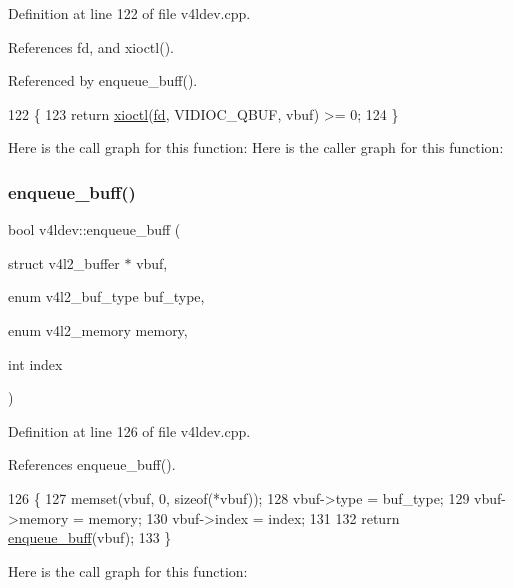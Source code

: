 Definition at line 122 of file v4ldev.\+cpp.



References fd, and xioctl().



Referenced by enqueue\+\_\+buff().


\begin{DoxyCode}
122                                                    \{
123     \textcolor{keywordflow}{return} \hyperlink{classv4ldev_ab93cb1ab18254ca362310b006bd2552d}{xioctl}(\hyperlink{classv4ldev_a2cd44be3be75a19ab8bec12b28e29142}{fd}, VIDIOC\_QBUF, vbuf) >= 0;
124 \}
\end{DoxyCode}
Here is the call graph for this function\+:
Here is the caller graph for this function\+:
\mbox{\label{classv4ldev_a4785a96e636f1dea81d2d64ec0c36d5a}} 
\subsubsection{\texorpdfstring{enqueue\+\_\+buff()}{enqueue\_buff()}\hspace{0.1cm}{\footnotesize\ttfamily [2/2]}}
{\footnotesize\ttfamily bool v4ldev\+::enqueue\+\_\+buff (\begin{DoxyParamCaption}\item[{struct v4l2\+\_\+buffer $\ast$}]{vbuf,  }\item[{enum v4l2\+\_\+buf\+\_\+type}]{buf\+\_\+type,  }\item[{enum v4l2\+\_\+memory}]{memory,  }\item[{int}]{index }\end{DoxyParamCaption})}



Definition at line 126 of file v4ldev.\+cpp.



References enqueue\+\_\+buff().


\begin{DoxyCode}
126                                                                                                            
               \{
127     memset(vbuf, 0, \textcolor{keyword}{sizeof}(*vbuf));
128     vbuf->type = buf\_type;
129     vbuf->memory = memory;
130     vbuf->index = index;
131 
132     \textcolor{keywordflow}{return} \hyperlink{classv4ldev_ae53ad5fcd680c9df8e7f2f564e575a35}{enqueue\_buff}(vbuf);
133 \}
\end{DoxyCode}
Here is the call graph for this function\+:
\mbox{\label{classv4ldev_a8b7c5ca137d864c8ffe32349b0aeb01a}} 
